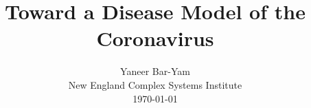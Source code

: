 \documentclass[onecolumn,journal]{IEEEtran}
\begin{document}
\title{\color{Brown}  Toward a Disease Model of the Coronavirus  \\
\vspace{-0.35ex}}
\author{Yaneer Bar-Yam \\ New England Complex Systems Institute \\
 \today 
  \vspace{-14ex} \\ 

   
\bigskip
\bigskip

\textbf{}
 }
    
\maketitle


\flushbottom %



\thispagestyle{empty} %




\renewcommand{\thefootnote}{\fnsymbol{footnote}}
\end{document}
